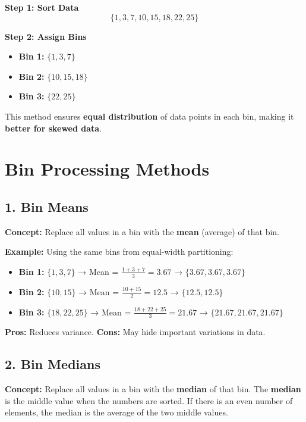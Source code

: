 \documentclass[a4paper,10pt]{article}
\begin{document}
\textbf{Step 1: Sort Data}  
\[
\{1, 3, 7, 10, 15, 18, 22, 25\}
\]

\textbf{Step 2: Assign Bins}
\begin{itemize}
    \item \textbf{Bin 1:} \(\{1, 3, 7\}\)
    \item \textbf{Bin 2:} \(\{10, 15, 18\}\)
    \item \textbf{Bin 3:} \(\{22, 25\}\)
\end{itemize}

This method ensures \textbf{equal distribution} of data points in each bin,  
making it \textbf{better for skewed data}.

\newpage %

\section*{\centering Bin Processing Methods}

\subsection*{1. Bin Means}
\textbf{Concept:}  
Replace all values in a bin with the \textbf{mean} (average) of that bin.

\textbf{Example:}  
Using the same bins from equal-width partitioning:

\begin{itemize}
    \item \textbf{Bin 1:} \(\{1, 3, 7\}\) → Mean = \(\frac{1+3+7}{3} = 3.67\) → \(\{3.67, 3.67, 3.67\}\)
    \item \textbf{Bin 2:} \(\{10, 15\}\) → Mean = \(\frac{10+15}{2} = 12.5\) → \(\{12.5, 12.5\}\)
    \item \textbf{Bin 3:} \(\{18, 22, 25\}\) → Mean = \(\frac{18+22+25}{3} = 21.67\) → \(\{21.67, 21.67, 21.67\}\)
\end{itemize}

\textbf{Pros:} Reduces variance.  
\textbf{Cons:} May hide important variations in data.

\vspace{0.5cm}

\subsection*{2. Bin Medians}
\textbf{Concept:}  
Replace all values in a bin with the \textbf{median} of that bin.  
The \textbf{median} is the middle value when the numbers are sorted. If there is an even number of elements, the median is the average of the two middle values.
\end{document}
